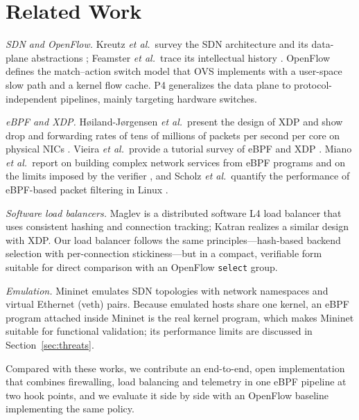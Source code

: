 \documentclass[conference]{IEEEtran}
\begin{document}
\section{Related Work}
\textit{SDN and OpenFlow.} Kreutz \textit{et al.}\ survey the SDN
architecture and its data-plane abstractions \cite{kreutz2015sdn}; Feamster
\textit{et al.}\ trace its intellectual history \cite{feamster2014road}.
OpenFlow \cite{mckeown2008openflow} defines the match--action switch model
that OVS \cite{pfaff2015ovs} implements with a user-space slow path and a
kernel flow cache. P4 \cite{bosshart2014p4} generalizes the data plane to
protocol-independent pipelines, mainly targeting hardware switches.

\textit{eBPF and XDP.} H{\o}iland-J{\o}rgensen \textit{et al.}\ present the
design of XDP and show drop and forwarding rates of tens of millions of
packets per second per core on physical NICs \cite{hoiland2018xdp}. Vieira
\textit{et al.}\ provide a tutorial survey of eBPF and XDP
\cite{vieira2020ebpf}. Miano \textit{et al.}\ report on building complex
network services from eBPF programs and on the limits imposed by the verifier
\cite{miano2018creating}, and Scholz \textit{et al.}\ quantify the performance
of eBPF-based packet filtering in Linux \cite{scholz2018filtering}.

\textit{Software load balancers.} Maglev \cite{eisenbud2016maglev} is a
distributed software L4 load balancer that uses consistent hashing and
connection tracking; Katran \cite{katran} realizes a similar design with XDP.
Our load balancer follows the same principles---hash-based backend selection
with per-connection stickiness---but in a compact, verifiable form suitable
for direct comparison with an OpenFlow \texttt{select} group.

\textit{Emulation.} Mininet \cite{lantz2010mininet} emulates SDN topologies
with network namespaces and virtual Ethernet (veth) pairs. Because emulated
hosts share one kernel, an eBPF program attached inside Mininet is the real
kernel program, which makes Mininet suitable for functional validation;
its performance limits are discussed in Section~\ref{sec:threats}.

Compared with these works, we contribute an end-to-end, open
implementation that combines firewalling, load balancing and telemetry in one
eBPF pipeline at two hook points, and we evaluate it side by side with an
OpenFlow baseline implementing the same policy.
\end{document}
